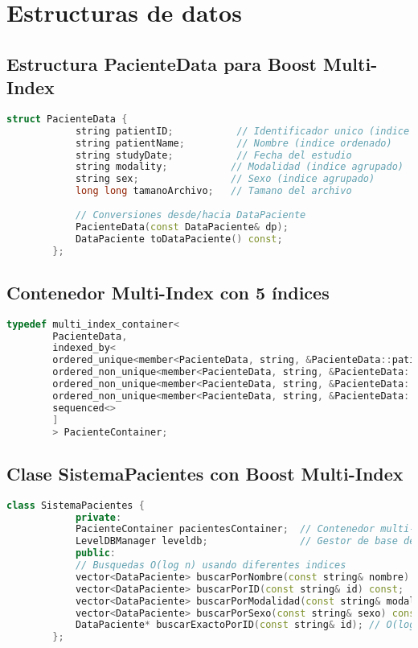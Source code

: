 \documentclass[12pt]{article}
\begin{document}
	\section{Estructuras de datos}
	
	\subsection*{Estructura PacienteData para Boost Multi-Index}
	\begin{lstlisting}[language=C++]
		struct PacienteData {
			string patientID;           // Identificador unico (indice unico)
			string patientName;         // Nombre (indice ordenado)
			string studyDate;           // Fecha del estudio
			string modality;           // Modalidad (indice agrupado)
			string sex;                // Sexo (indice agrupado)
			long long tamanoArchivo;   // Tamano del archivo
			
			// Conversiones desde/hacia DataPaciente
			PacienteData(const DataPaciente& dp);
			DataPaciente toDataPaciente() const;
		};
	\end{lstlisting}
	
	\subsection*{Contenedor Multi-Index con 5 índices}
	\begin{lstlisting}[language=C++]
		typedef multi_index_container<
		PacienteData,
		indexed_by<
		ordered_unique<member<PacienteData, string, &PacienteData::patientID>>,      // Indice 0: ID unico
		ordered_non_unique<member<PacienteData, string, &PacienteData::patientName>>, // Indice 1: Nombre
		ordered_non_unique<member<PacienteData, string, &PacienteData::modality>>,    // Indice 2: Modalidad
		ordered_non_unique<member<PacienteData, string, &PacienteData::sex>>,         // Indice 3: Sexo
		sequenced<>                                                                   // Indice 4: Secuencial
		]
		> PacienteContainer;
	\end{lstlisting}
	
	\subsection*{Clase SistemaPacientes con Boost Multi-Index}
	\begin{lstlisting}[language=C++]
		class SistemaPacientes {
			private:
			PacienteContainer pacientesContainer;  // Contenedor multi-index
			LevelDBManager leveldb;                // Gestor de base de datos
			public:
			// Busquedas O(log n) usando diferentes indices
			vector<DataPaciente> buscarPorNombre(const string& nombre) const;
			vector<DataPaciente> buscarPorID(const string& id) const;
			vector<DataPaciente> buscarPorModalidad(const string& modalidad) const;
			vector<DataPaciente> buscarPorSexo(const string& sexo) const;
			DataPaciente* buscarExactoPorID(const string& id); // O(log n)
		};
	\end{lstlisting}
	
\end{document}
